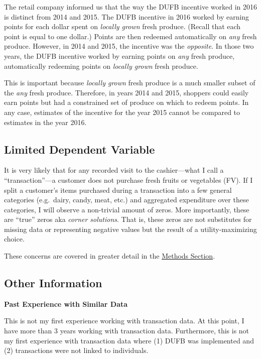 \documentclass[12pt,letterpaperpaper,]{book}
\begin{document}
The retail company informed us that the way the DUFB incentive worked in
2016 is distinct from 2014 and 2015. The DUFB incentive in 2016 worked
by earning points for each dollar spent on \emph{locally grown} fresh
produce. (Recall that each point is equal to one dollar.) Points are
then redeemed automatically on \emph{any} fresh produce. However, in
2014 and 2015, the incentive was the \emph{opposite}. In those two
years, the DUFB incentive worked by earning points on \emph{any} fresh
produce, automatically redeeming points on \emph{locally grown} fresh
produce.

This is important because \emph{locally grown} fresh produce is a much
smaller subset of the \emph{any} fresh produce. Therefore, in years 2014
and 2015, shoppers could easily earn points but had a constrained set of
produce on which to redeem points. In any case, estimates of the
incentive for the year 2015 cannot be compared to estimates in the year
2016.

\subsection*{Limited Dependent
Variable}\label{limited-dependent-variable}

It is very likely that for any recorded visit to the cashier---what I
call a ``transaction''---a customer does not purchase fresh fruits or
vegetables (FV). If I split a customer's items purchased during a
transaction into a few general categories (e.g.~dairy, candy, meat,
etc.) and aggregated expenditure over these categories, I will observe a
non-trivial amount of zeros. More importantly, these are ``true'' zeros
aka \emph{corner solutions}. That is, these zeros are not substitutes
for missing data or representing negative values but the result of a
utility-maximizing choice.

These concerns are covered in greater detail in the
\protect\hyperlink{methods-1}{Methods Section}.

\subsection*{Other Information}\label{other-information}

\textbf{Past Experience with Similar Data}

This is not my first experience working with transaction data. At this
point, I have more than 3 years working with transaction data.
Furthermore, this is not my first experience with transaction data where
(1) DUFB was implemented and (2) transactions were not linked to
individuals.
\end{document}
